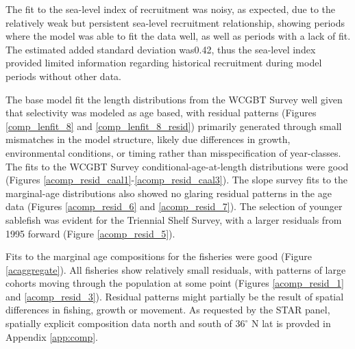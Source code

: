 \documentclass[11pt,
  english,
  a4paper,
]{article}
\begin{document}

The fit to the sea-level index of recruitment was noisy, as expected, due to the relatively weak but persistent sea-level recruitment relationship, showing periods where the model was able to fit the data well, as well as periods with a lack of fit. The estimated added standard deviation was0.42, thus the sea-level index provided limited information regarding historical recruitment during model periods without other data.

\leavevmode\tagmcend\tagstructend\par


The base model fit the length distributions from the WCGBT Survey well given that selectivity was modeled as age based, with residual patterns (Figures \ref{comp_lenfit_8} and \ref{comp_lenfit_8_resid}) primarily generated through small mismatches in the model structure, likely due differences in growth, environmental conditions, or timing rather than misspecification of year-classes. The fits to the WCGBT Survey conditional-age-at-length distributions were good (Figures \ref{acomp_resid_caal1}-\ref{acomp_resid_caal3}). The slope survey fits to the marginal-age distributions also showed no glaring residual patterns in the age data (Figures \ref{acomp_resid_6} and \ref{acomp_resid_7}). The selection of younger sablefish was evident for the Triennial Shelf Survey, with a larger residuals from 1995 forward (Figure \ref{acomp_resid_5}).

\leavevmode\tagmcend\tagstructend\par


Fits to the marginal age compositions for the fisheries were good (Figure \ref{acaggregate}). All fisheries show relatively small residuals, with patterns of large cohorts moving through the population at some point (Figures \ref{acomp_resid_1} and \ref{acomp_resid_3}). Residual patterns might partially be the result of spatial differences in fishing, growth or movement. As requested by the STAR panel, spatially explicit composition data north and south of {\(36^{\circ}\)\leavevmode\tagmcend\tagstructend} N lat is provded in Appendix \ref{app:comp}.

\leavevmode\tagmcend\tagstructend\par
\end{document}
